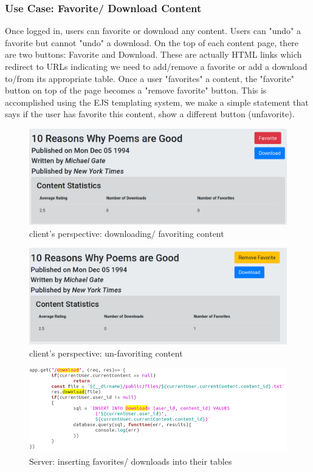 \documentclass[letter, 12pt, titlepage]{article}
\begin{document}
\subsubsection{Use Case: Favorite/ Download Content}
	Once logged in, users can favorite or download any content. Users can "undo" a favorite but cannot "undo" a download. On the top of each content page, there are two buttons: Favorite and Download. These are actually HTML links which redirect to URLs indicating we need to add/remove a favorite or add a download to/from its appropriate table. Once a user "favorites" a content, the "favorite" button on top of the page becomes a "remove favorite" button. This is accomplished using the EJS templating system, we make a simple statement that says if the user has favorite this  content, show a different button (unfavorite).
	\begin{figure}[h!]
		\centering
		\includegraphics[scale=0.30]{favdl.png}
		\caption{client's perspective: downloading/ favoriting content}
	\end{figure}
	\begin{figure}[h!]
		\centering
		\includegraphics[scale=0.30]{unfav.png}
		\caption{client's perspective: un-favoriting content}
	\end{figure}
	\begin{figure}[h!]
		\centering
		\includegraphics[scale=0.45]{favdl-code.png}
		\caption{Server: inserting favorites/ downloads into their tables}
	\end{figure}
\end{document}
